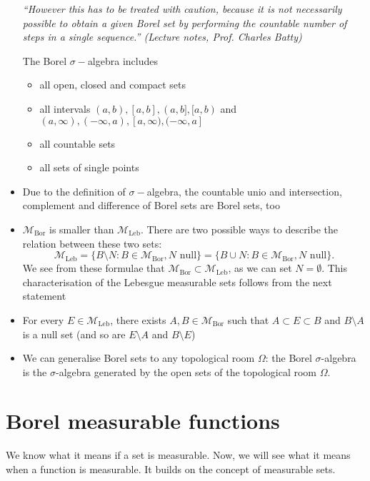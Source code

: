 \documentclass[a4paper, 11pt]{article}
\theoremstyle{plain}
\theoremstyle{definition}
\begin{document}
\begin{itemize}
	 \textit{``However this has to be treated with caution, because it is not necessarily possible to obtain a given Borel set by performing the countable number of steps in a single sequence.'' (Lecture notes, Prof. Charles Batty)} 
	 
	 The Borel $\sigma-$algebra includes
	 \begin{itemize}
	 	\item  all open, closed and compact sets
	 	\item all intervals $(a,b), [a,b], (a,b], [a,b)$ and $(a, \infty), (-\infty,a), [a, \infty), (-\infty,a]$
	 	\item all countable sets
	 	\item all sets of single points
	 \end{itemize}
 
 	\item Due to the definition of $\sigma-$algebra, the countable unio and intersection, complement and difference of Borel sets are Borel sets, too
 	
 	\item $\mathcal M_{\mathrm{Bor}}$ is smaller than $\mathcal M_{\mathrm{Leb}}$. There are two possible ways to describe the relation between these two sets:
 	\[
 		\mathcal M_{\mathrm{Leb}} = \{ B \setminus N :  B \in \mathcal M_{\mathrm{Bor}}, N \text{ null} \} = \{ B \cup N :  B \in \mathcal M_{\mathrm{Bor}}, N \text{ null} \}.
 	\]
 	We see from these formulae that $\mathcal M_{\mathrm{Bor}} \subset \mathcal M_{\mathrm{Leb}}$, as we can set $N = \emptyset$. This characterisation of the Lebesgue measurable sets follows from the next statement
 		
 	\item For every $E \in \mathcal M_{\mathrm{Leb}}$, there exists $A,B \in \mathcal M_{\mathrm{Bor}}$ such that $A \subset E \subset B$ and $B \setminus A$ is a null set (and  so are $E \setminus A$ and $B \setminus E$)
 	
 	\item We can generalise Borel sets to any topological room $\Omega$: the Borel $\sigma$-algebra is the $\sigma$-algebra generated by the open sets of the topological room $\Omega$.
\end{itemize}

\section{Borel measurable functions}
We know what it means if a set is measurable. Now, we will see what it means when a function is measurable. It builds on the concept of measurable sets. \\
\end{document}
